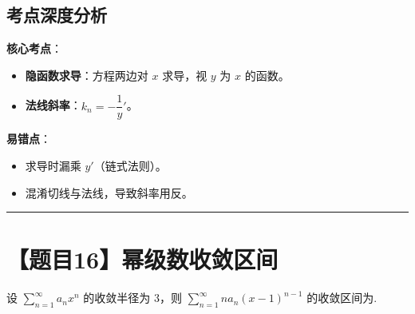 \documentclass[UTF8,10pt]{ctexart}
\newenvironment{redenv}{\color{red}}{}
\newenvironment{conceptbox}{%
    \begin{tcolorbox}[colback=red!5, colframe=red!50!black, title=概念解析, fonttitle=\bfseries, top=2pt, bottom=2pt, left=2pt, right=2pt]
}{%
    \end{tcolorbox}
}
\newcommand{\problemrule}{\par\filbreak\noindent\rule{\textwidth}{1.5pt}\vspace{-0.5em}}
\begin{document}
\begin{redenv}
\subsection*{考点深度分析}
\begin{conceptbox}
\textbf{核心考点}：
\begin{itemize}
    \item \textbf{隐函数求导}：方程两边对 $x$ 求导，视 $y$ 为 $x$ 的函数。
    \item \textbf{法线斜率}：$k_n = -\dfrac{1}{y}'$。
\end{itemize}
\textbf{易错点}：
\begin{itemize}
    \item 求导时漏乘 $y'$（链式法则）。
    \item 混淆切线与法线，导致斜率用反。
\end{itemize}
\end{conceptbox}
\end{redenv}

\problemrule
\section*{【题目16】幂级数收敛区间}
设 $\sum\limits_{n=1}^{\infty} a_n x^n$ 的收敛半径为 3，则 $\sum\limits_{n=1}^{\infty} n a_n (x-1)^{n-1}$ 的收敛区间为\underline{\hspace{4cm}}.
\end{document}

